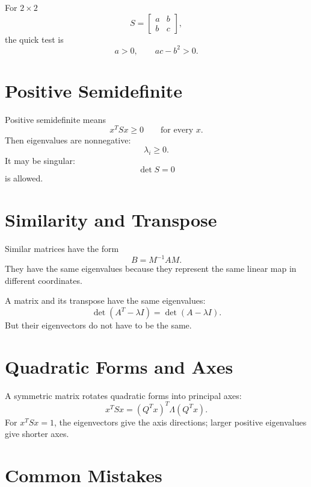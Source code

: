 \documentclass[10pt]{article}
\begin{document}
For \(2\times2\)
\[
S=
\begin{bmatrix}
a&b\\
b&c
\end{bmatrix},
\]
the quick test is
\[
a>0,
\qquad
ac-b^{2}>0.
\]

\section{Positive Semidefinite}

Positive semidefinite means
\[
x^{T}Sx\ge0
\qquad
\text{for every }x.
\]
Then eigenvalues are nonnegative:
\[
\lambda_i\ge0.
\]
It may be singular:
\[
\det S=0
\]
is allowed.


\section{Similarity and Transpose}

Similar matrices have the form
\[
B=M^{-1}AM.
\]
They have the same eigenvalues because they represent the same linear map in different coordinates.

A matrix and its transpose have the same eigenvalues:
\[
\det(A^{T}-\lambda I)=\det(A-\lambda I).
\]
But their eigenvectors do not have to be the same.

\section{Quadratic Forms and Axes}

A symmetric matrix rotates quadratic forms into principal axes:
\[
x^{T}Sx=(Q^{T}x)^{T}\Lambda(Q^{T}x).
\]
For \(x^{T}Sx=1\), the eigenvectors give the axis directions; larger positive eigenvalues give shorter axes.

\section{Common Mistakes}
\end{document}
